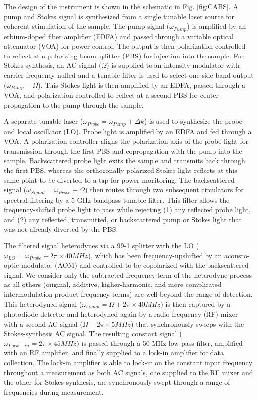 \documentclass[%
  reprint,
  superscriptaddress,
  amsmath,amssymb,
  aps,
  prapplied,
]{revtex4-2}
\begin{document}
The design of the instrument is shown in the schematic in Fig. \ref{fig:CABS}. A pump and Stokes signal is synthesized from a single tunable laser source for coherent stimulation of the sample. The pump signal ($\omega_{Pump}$) is amplified by an erbium-doped fiber amplifier (EDFA) and passed through a variable optical attenuator (VOA) for power control. The output is then polarization-controlled to reflect at a polarizing beam splitter (PBS) for injection into the sample. For Stokes synthesis, an AC signal ($\Omega$) is supplied to an intensity modulator with carrier frequency nulled and a tunable filter is used to select one side band output ($\omega_{Pump} - \Omega$). This Stokes light is then amplified by an EDFA, passed through a VOA, and polarization-controlled to reflect at a second PBS for couter-propagation to the pump through the sample.

A separate tunable laser ($\omega_{Probe} = \omega_{Pump} + \Delta k$) is used to synthesize the probe and local oscillator (LO). Probe light is amplified by an EDFA and fed through a VOA. A polarization controller aligns the polarization axis of the probe light for transmission through the first PBS and copropagation with the pump into the sample. Backscattered probe light exits the sample and transmits back through the first PBS, whereas the orthogonally polarized Stokes light reflects at this same point to be diverted to a tap for power monitoring. The backscattered signal ($\omega_{Signal} = \omega_{Probe} + \Omega$) then routes through two subsequent circulators for spectral filtering by a 5 GHz bandpass tunable filter. This filter allows the frequency-shifted probe light to pass while rejecting (1) any reflected probe light, and (2) any reflected, transmitted, or backscattered pump or Stokes light that was not already diverted by the PBS.

The filtered signal heterodynes via a 99-1 splitter with the LO ($\omega_{LO} = \omega_{Probe} + 2\pi\times40 MHz$), which has been frequency-upshifted by an acousto-optic modulator (AOM) and controlled to be copolarized with the backscattered signal. We consider only the subtracted frequency term of the heterodyne process as all others (original, additive, higher-harmonic, and more complicated intermodulation product frequency terms) are well beyond the range of detection. This heterodyned signal ($\omega_{signal} = \Omega + 2\pi\times40 MHz$) is then captured by a photodiode detector and heterodyned again by a radio frequency (RF) mixer with a second AC signal ($\Omega - 2\pi\times5 MHz$) that synchronously sweeps with the Stokes-synthesis AC signal. The resulting constant signal ($\omega_{Lock-in} = 2\pi\times45 MHz$) is passed through a 50 MHz low-pass filter, amplified with an RF amplifier, and finally supplied to a lock-in amplifier for data collection. The lock-in amplifier is able to lock-in on the constant input frequency throughout a measurement as both AC signals, one supplied to the RF mixer and the other for Stokes synthesis, are synchronously swept through a range of frequencies during measurement.
\end{document}
